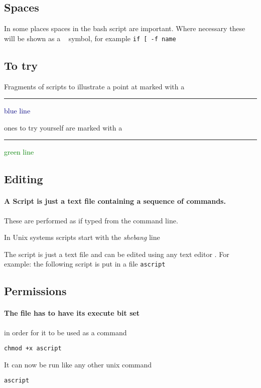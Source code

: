 \documentclass{article}
\begin{document}
\subsection{Spaces}
In some places spaces in the bash script are important.  Where
necessary these will be shown as a \verb*| | symbol, for example
\verb*'if [ -f name'

\subsection{To try}
Fragments of scripts to illustrate a point at marked with a
\textcolor{Navy}{\rule[-0.3\baselineskip]{1pt}{\baselineskip} blue
  line} ones to try yourself are  marked with a
\textcolor{Green}{\rule[-0.3\baselineskip]{3pt}{\baselineskip} green
  line}

\subsection{Editing}
\paragraph{A Script is just a text file containing a sequence of
  commands.}  These are performed as if typed from the command line.

In Unix systems scripts start with the \emph{shebang} line
\begin{tcolorbox}

\end{tcolorbox}
The script is just a text file and can be edited using any text
editor
.
For example: the following script is put in a file \texttt{ascript}
  \begin{tcolorbox}[title=script \texttt{ascript}]
    
  \end{tcolorbox}

\subsection{Permissions}
\paragraph{The file has to have its execute bit set } in order for it
to be used as a command
\begin{verbatim}
chmod +x ascript
\end{verbatim}
It can now be run like any other unix command
\begin{verbatim}
ascript
\end{verbatim}
\end{document}
